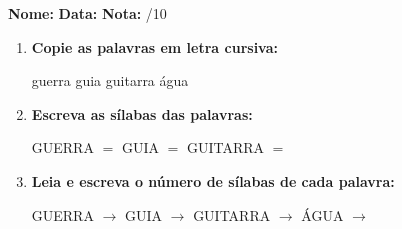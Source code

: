 \begin{exercicio}



\noindent\textbf{Nome:} \underline{\hspace{3.2cm}} \quad \textbf{Data:} \underline{\hspace{1.6cm}} \quad \textbf{Nota:} \underline{\hspace{0.9cm}}/10


\begin{enumerate}

  \item \textbf{Copie as palavras em letra cursiva:}
  \begin{center}
  guerra \quad guia \quad guitarra \quad água
  \end{center}
  \begin{center}
  \underline{\hspace{2.4cm}} \quad \underline{\hspace{2.4cm}} \quad \underline{\hspace{2.4cm}} \quad \underline{\hspace{2.4cm}}
  \end{center}

  \item \textbf{Escreva as sílabas das palavras:}
  \begin{center}
  GUERRA $=$ \underline{\hspace{1.5cm}} \underline{\hspace{1.5cm}} \quad GUIA $=$ \underline{\hspace{1.5cm}} \underline{\hspace{1.5cm}} \quad GUITARRA $=$ \underline{\hspace{1.5cm}} \underline{\hspace{1.5cm}}
  \end{center}

  \item \textbf{Leia e escreva o número de sílabas de cada palavra:}
  \begin{center}
  GUERRA $\rightarrow$ \underline{\hspace{0.9cm}} \quad GUIA $\rightarrow$ \underline{\hspace{0.9cm}} \quad GUITARRA $\rightarrow$ \underline{\hspace{0.9cm}} \quad ÁGUA $\rightarrow$ \underline{\hspace{0.9cm}}
  \end{center}


\end{enumerate}
\end{exercicio}
